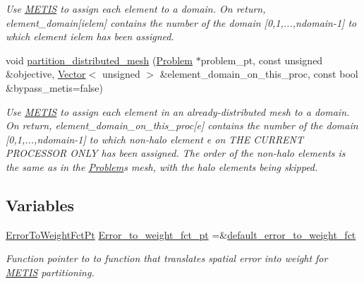 \begin{DoxyCompactItemize}
\begin{DoxyCompactList}\small\item\em Use \hyperlink{namespaceoomph_1_1METIS}{M\+E\+T\+IS} to assign each element to a domain. On return, element\+\_\+domain\mbox{[}ielem\mbox{]} contains the number of the domain \mbox{[}0,1,...,ndomain-\/1\mbox{]} to which element ielem has been assigned. \end{DoxyCompactList}\item 
void \hyperlink{namespaceoomph_1_1METIS_a9d95103cfa79d38f80b3b0a6db949701}{partition\+\_\+distributed\+\_\+mesh} (\hyperlink{classoomph_1_1Problem}{Problem} $\ast$problem\+\_\+pt, const unsigned \&objective, \hyperlink{classoomph_1_1Vector}{Vector}$<$ unsigned $>$ \&element\+\_\+domain\+\_\+on\+\_\+this\+\_\+proc, const bool \&bypass\+\_\+metis=false)
\begin{DoxyCompactList}\small\item\em Use \hyperlink{namespaceoomph_1_1METIS}{M\+E\+T\+IS} to assign each element in an already-\/distributed mesh to a domain. On return, element\+\_\+domain\+\_\+on\+\_\+this\+\_\+proc\mbox{[}e\mbox{]} contains the number of the domain \mbox{[}0,1,...,ndomain-\/1\mbox{]} to which non-\/halo element e on T\+HE C\+U\+R\+R\+E\+NT P\+R\+O\+C\+E\+S\+S\+OR O\+N\+LY has been assigned. The order of the non-\/halo elements is the same as in the \hyperlink{classoomph_1_1Problem}{Problem}\textquotesingle{}s mesh, with the halo elements being skipped. \end{DoxyCompactList}\end{DoxyCompactItemize}
\subsection*{Variables}
\begin{DoxyCompactItemize}
\item 
\hyperlink{namespaceoomph_1_1METIS_aec228e35df8426d16639b961fcf98df1}{Error\+To\+Weight\+Fct\+Pt} \hyperlink{namespaceoomph_1_1METIS_af21fbb8dba025be51b3e27c1822243a5}{Error\+\_\+to\+\_\+weight\+\_\+fct\+\_\+pt} =\&\hyperlink{namespaceoomph_1_1METIS_af5633647d4ff099648151db2d7d0a1e5}{default\+\_\+error\+\_\+to\+\_\+weight\+\_\+fct}
\begin{DoxyCompactList}\small\item\em Function pointer to to function that translates spatial error into weight for \hyperlink{namespaceoomph_1_1METIS}{M\+E\+T\+IS} partitioning. \end{DoxyCompactList}\end{DoxyCompactItemize}



